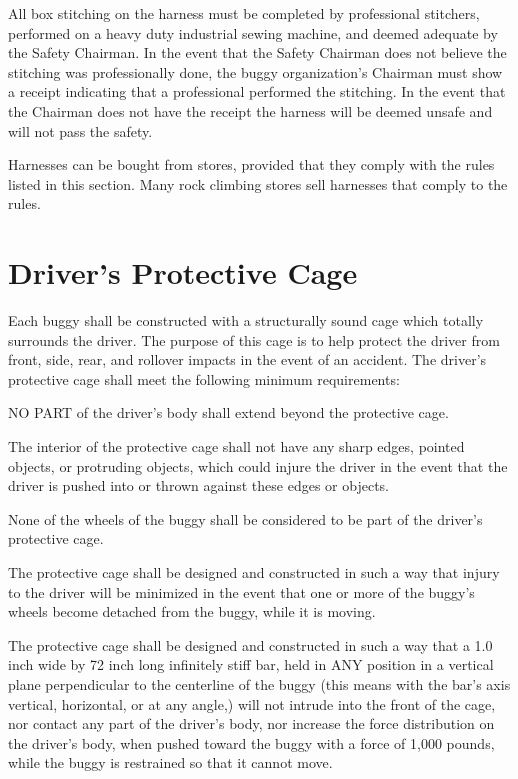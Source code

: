 	All box stitching on the harness must be completed by professional stitchers,
	performed on a heavy duty industrial sewing machine, and deemed adequate by the
	Safety Chairman. In the event that the Safety Chairman does not believe the
	stitching was professionally done, the buggy organization's Chairman must
	show a receipt indicating that a professional performed the stitching. In the
	event that the Chairman does not have the receipt the harness will be deemed
	unsafe and will not pass the safety.

	Harnesses can be bought from stores, provided that they comply with the rules
	listed in this section. Many rock climbing stores sell harnesses that comply to
	the rules.

\section{Driver's Protective Cage}

	Each buggy shall be constructed with a structurally sound cage which totally
	surrounds the driver. The purpose of this cage is to help protect the driver
	from front, side, rear, and rollover impacts in the event of an accident. The
	driver's protective cage shall meet the following minimum requirements:
	\newline

	NO PART of the driver's body shall extend beyond the protective cage.

	The interior of the protective cage shall not have any sharp edges, pointed
	objects, or protruding objects, which could injure the driver in the event that
	the driver is pushed into or thrown against these edges or objects.

	None of the wheels of the buggy shall be considered to be part of the driver's
	protective cage.

	The protective cage shall be designed and constructed in such a way that injury
	to the driver will be minimized in the event that one or more of the buggy's
	wheels become detached from the buggy, while it is moving.

	The protective cage shall be designed and constructed in such a way that a 1.0
	inch wide by 72 inch long infinitely stiff bar, held in ANY position in a
	vertical plane perpendicular to the centerline of the buggy (this means with
	the bar's axis vertical, horizontal, or at any angle,) will not intrude into
	the front of the cage, nor contact any part of the driver's body, nor increase
	the force distribution on the driver's body, when pushed toward the buggy with
	a force of 1,000 pounds, while the buggy is restrained so that it cannot move.

